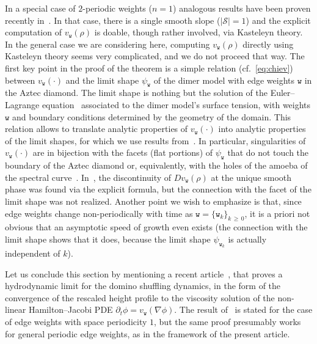 \documentclass[10pt]{amsart}
\theoremstyle{definition}\newtheorem{defi}[theo]{Definition}\newtheorem{rema}[theo]{Remark}\newtheorem{exam}[theo]{Example}\newtheorem{exem}[theo]{Example}\newtheorem{nota}[theo]{Notation}
\newcommand{\ttw}{\mathtt{w}}
\newcommand{\clS}{\mathcal{S}}
\begin{document}
In a special case of $2$-periodic weights ($n=1$) analogous results have been proven recently in~\cite{CT:18}. In that case, there is a single smooth slope ($|\clS|=1$) and the explicit computation of $v_{\ttw}(\rho)$ is doable, though rather involved, via Kasteleyn theory. In the general case we are considering here, computing $v_{\ttw}(\rho)$ directly using Kasteleyn theory seems very complicated, and we do not proceed that way. The first key point in the proof of the theorem is a simple relation (cf.~\eqref{eq:chiev}) between $v_{\ttw}(\cdot)$ and the limit shape $\psi_{\ttw}$ of the dimer model with edge weights $\ttw$ in the Aztec diamond. The limit shape is nothing but the solution of the Euler--Lagrange equation~\cite{KO07} associated to the dimer model's surface tension, with weights $\ttw$ and boundary conditions determined by the geometry of the domain. This relation allows to translate analytic properties of $v_{\ttw}(\cdot)$ into analytic properties of the limit shapes, for which we use results from~\cite{Duse,SS10}. In particular, singularities of $v_{\ttw}(\cdot)$ are in bijection with the facets (flat portions) of $\psi_{\ttw}$ that do not touch the boundary of the Aztec diamond or, equivalently, with the holes of the amoeba of the spectral curve~\cite{Kenyon2003}. In~\cite{CT:18}, the discontinuity of $Dv_{\ttw}(\rho)$ at the unique smooth phase was found via the explicit formula, but the connection with the facet of the limit shape was not realized. Another point we wish to emphasize is that, since edge weights change non-periodically with time as $\ttw=\{\ttw_k\}_{k\,\ge\,0}$, it is a priori not obvious that an asymptotic speed of growth even exists (the connection with the limit shape shows that it does, because the limit shape $\psi_{\ttw_k}$ is actually independent of $k$).


Let us conclude this section by mentioning a recent article~\cite{zhang2018domino}, that proves a hydrodynamic limit for the domino shuffling dynamics, in the form of the convergence of the rescaled height profile to the viscosity solution of the non-linear Hamilton--Jacobi PDE $\partial_t \phi=v_{\ttw}(\nabla\phi)$. The result of~\cite{zhang2018domino} is stated for the case of edge weights with space periodicity $1$, but the same proof presumably works for general periodic edge weights, as in the framework of the present article.
\end{document}
